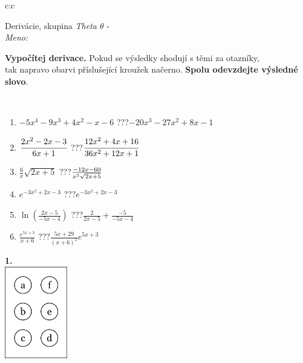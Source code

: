 \documentclass[10pt]{report}
\begin{document}
\begin{tabular}{c:c}
\begin{minipage}[c][104.5mm][t]{0.5\linewidth}
\begin{center}
\vspace{7mm}
{\huge Derivácie, skupina \textit{Theta $\theta$} -}\\[5mm]
\textit{Meno:}\phantom{xxxxxxxxxxxxxxxxxxxxxxxxxxxxxxxxxxxxxxxxxxxxxxxxxxxxxxxxxxxxxxxxx}\\[5mm]
\begin{minipage}{0.95\linewidth}
\begin{center}
\textbf{Vypočítej derivace.} Pokud se výsledky shodují s těmi za otazníky,\\tak napravo obarvi příslušející kroužek načerno. \textbf{Spolu odevzdejte výsledné slovo}.
\end{center}
\end{minipage}
\\[1mm]
\begin{minipage}{0.79\linewidth}
\begin{center}
\begin{varwidth}{\linewidth}
\begin{enumerate}
\normalsize
\item $-5x^4-9x^3+4x^2-x-6$\quad \dotfill\; ???\;\dotfill \quad $-20x^3-27x^2+8x-1$
\item $\cfrac{2x^2-2x-3}{6x+1}$\quad \dotfill\; ???\;\dotfill \quad $\cfrac{12x^2+4x+16}{36x^2+12x+1}$
\item $\frac{6}{x}\sqrt{2x+5}$\quad \dotfill\; ???\;\dotfill \quad $\frac{-12x-60}{x^2 \sqrt{\smash[b]{2x+5}}}$
\item $e^{-3x^2+2x-3}$\quad \dotfill\; ???\;\dotfill \quad $e^{-3x^2+2x-3}$
\item $\ln{\left(\frac{2x-5}{-5x-4}\right)}$\quad \dotfill\; ???\;\dotfill \quad $\frac{2}{2x-5}+\frac{-5}{-5x-4}$
\item $\frac{e^{5x+3}}{x+6}$\quad \dotfill\; ???\;\dotfill \quad $\frac{5x+29}{(x+6)^2}e^{5x+3}$
\end{enumerate}
\end{varwidth}
\end{center}
\end{minipage}
\begin{minipage}{0.20\linewidth}
\begin{center}
{\Huge\bfseries 1.} \\[2mm]
\includegraphics[height=40mm]{../images/braille.png}

\end{center}
\end{minipage}
\end{center}
\end{minipage}
\end{tabular}
\end{document}
